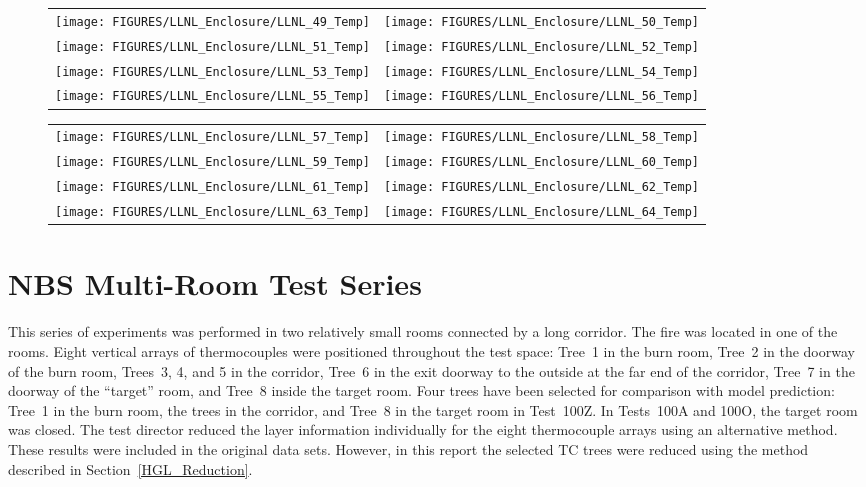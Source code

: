 \begin{figure}[p]
\begin{tabular*}{\textwidth}{l@{\extracolsep{\fill}}r}
\texttt{[image: FIGURES/LLNL\_Enclosure/LLNL\_49\_Temp]} &
\texttt{[image: FIGURES/LLNL\_Enclosure/LLNL\_50\_Temp]} \\
\texttt{[image: FIGURES/LLNL\_Enclosure/LLNL\_51\_Temp]} &
\texttt{[image: FIGURES/LLNL\_Enclosure/LLNL\_52\_Temp]} \\
\texttt{[image: FIGURES/LLNL\_Enclosure/LLNL\_53\_Temp]} &
\texttt{[image: FIGURES/LLNL\_Enclosure/LLNL\_54\_Temp]} \\
\texttt{[image: FIGURES/LLNL\_Enclosure/LLNL\_55\_Temp]} &
\texttt{[image: FIGURES/LLNL\_Enclosure/LLNL\_56\_Temp]}
\end{tabular*}
\label{LLNL_Enclosure_Temp_7}
\end{figure}

\begin{figure}[p]
\begin{tabular*}{\textwidth}{l@{\extracolsep{\fill}}r}
\texttt{[image: FIGURES/LLNL\_Enclosure/LLNL\_57\_Temp]} &
\texttt{[image: FIGURES/LLNL\_Enclosure/LLNL\_58\_Temp]} \\
\texttt{[image: FIGURES/LLNL\_Enclosure/LLNL\_59\_Temp]} &
\texttt{[image: FIGURES/LLNL\_Enclosure/LLNL\_60\_Temp]} \\
\texttt{[image: FIGURES/LLNL\_Enclosure/LLNL\_61\_Temp]} &
\texttt{[image: FIGURES/LLNL\_Enclosure/LLNL\_62\_Temp]} \\
\texttt{[image: FIGURES/LLNL\_Enclosure/LLNL\_63\_Temp]} &
\texttt{[image: FIGURES/LLNL\_Enclosure/LLNL\_64\_Temp]}
\end{tabular*}
\label{LLNL_Enclosure_Temp_8}
\end{figure}

\clearpage


\section{NBS Multi-Room Test Series}

This series of experiments was performed in two relatively small rooms connected by a long corridor. The fire was located in one of the rooms.  Eight vertical arrays of thermocouples were positioned throughout the test space: Tree~1 in the burn room, Tree~2 in the doorway of the burn room, Trees~3, 4, and 5 in the corridor, Tree~6 in the exit doorway to the outside at the far end of the corridor, Tree~7 in the doorway of the ``target'' room, and Tree~8 inside the target room.  Four trees have been selected for comparison with model prediction: Tree~1 in the burn room, the trees in the corridor, and Tree~8 in the target room in Test~100Z. In Tests~100A and 100O, the target room was closed. The test director reduced the layer information individually for the eight thermocouple arrays using an alternative method. These results were included in the original data sets. However, in this report the selected TC trees were reduced using the method described in Section~\ref{HGL_Reduction}.

